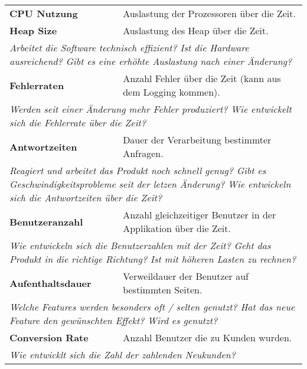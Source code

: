   \begin{table}[H]
    \centering
    \begin{tabular}{p{5cm}p{9.5cm}} \toprule
    \textbf{CPU Nutzung} & Auslastung der Prozessoren über die Zeit. \\
    \textbf{Heap Size} & Auslastung des Heap über die Zeit. \\
    \multicolumn{2}{p{14.5cm}}{\textit{Arbeitet die Software technisch effizient? \newline Ist die Hardware ausreichend? \newline Gibt es eine erhöhte Auslastung nach einer Änderung?}} \\ \midrule
    \textbf{Fehlerraten} & Anzahl Fehler über die Zeit (kann aus dem Logging kommen). \\
    \multicolumn{2}{p{14.5cm}}{\textit{Werden seit einer Änderung mehr Fehler produziert? \newline Wie entwickelt sich die Fehlerrate über die Zeit?}} \\ \midrule
    \textbf{Antwortzeiten} & Dauer der Verarbeitung bestimmter Anfragen. \\
    \multicolumn{2}{p{14.5cm}}{\textit{Reagiert und arbeitet das Produkt noch schnell genug? \newline Gibt es Geschwindigkeitsprobleme seit der letzen Änderung? \newline Wie entwickeln sich die Antwortzeiten über die Zeit?}} \\ \midrule
    \textbf{Benutzeranzahl} & Anzahl gleichzeitiger Benutzer in der Applikation über die Zeit. \\
    \multicolumn{2}{p{14.5cm}}{\textit{Wie entwickeln sich die Benutzerzahlen mit der Zeit? \newline Geht das Produkt in die richtige Richtung? \newline Ist mit höheren Lasten zu rechnen?}} \\ \midrule
    \textbf{Aufenthaltsdauer} & Verweildauer der Benutzer auf bestimmten Seiten. \\
    \multicolumn{2}{p{14.5cm}}{\textit{Welche Features werden besonders oft / selten genutzt? \newline Hat das neue Feature den gewünschten Effekt? Wird es genutzt?}} \\ \midrule
    \textbf{Conversion Rate} & Anzahl Benutzer die zu Kunden wurden. \\
    \multicolumn{2}{p{14.5cm}}{\textit{Wie entwicklt sich die Zahl der zahlenden Neukunden?}} \\ \midrule

\end{tabular}
\end{table}
